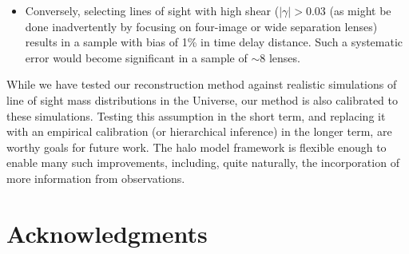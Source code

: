 \documentclass[useAMS,usenatbib]{mn2e}
\begin{document}
\begin{itemize}
\item Conversely, selecting lines of sight with high shear ($|\gamma| >
0.03$ (as might be done inadvertently by focusing on four-image or wide
separation lenses) results in a sample with bias of 1\% in time delay
distance. Such a systematic error would become significant in a sample of $\sim$8 lenses. 


\end{itemize}





While we have tested our reconstruction method against realistic simulations
of line of sight mass distributions in the Universe, our method is also 
calibrated to these simulations. Testing this assumption in the short term,
and replacing it with an empirical calibration (or hierarchical inference) in
the longer term, are worthy goals for future work. The halo model framework is
flexible enough to enable many such improvements, including, quite naturally,
the incorporation of more information from observations. 



\section*{Acknowledgments}
 
\end{document}
